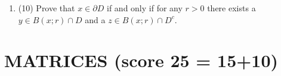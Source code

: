 \documentclass[12pt]{article}
\newtheorem*{solution}{Solution}
\newtheorem*{comments}{Comments}
\numberwithin{equation}{section}  %
\numberwithin{table}{section}
\numberwithin{algorithm}{section}
\theoremstyle{definition}
\newcommand{\<}{\langle}
\renewcommand{\>}{\rangle}
\begin{document}
\begin{enumerate}
\begin{enumerate}
\item (10)
Prove that $x \in \partial D$ if and only if for any $r>0$ there exists
a $y \in B(x;r) \cap D$ and a $z \in B(x;r) \cap D^c.$
\end{enumerate}

\end{enumerate}



\section{MATRICES 
{\small(score 25 = 15+10)}
}
\end{document}
